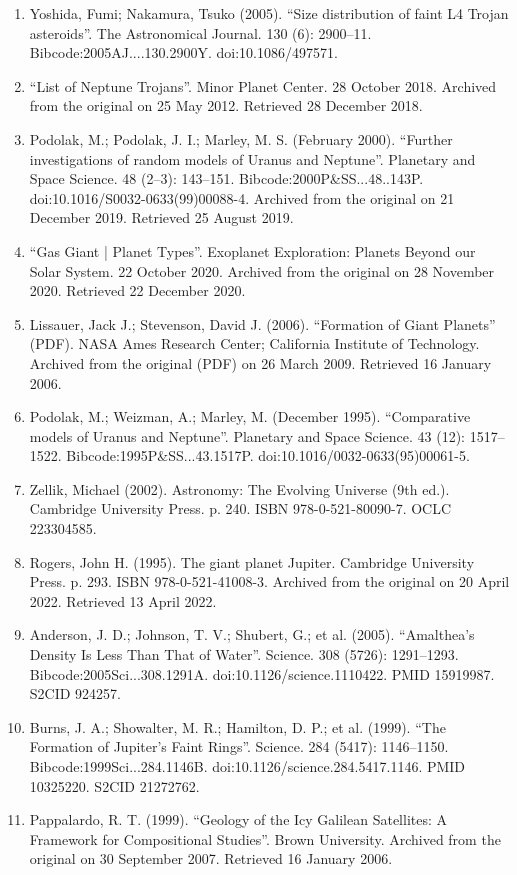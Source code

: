 \begin{enumerate}
\item Yoshida, Fumi; Nakamura, Tsuko (2005). ``Size distribution of faint L4 Trojan asteroids''. The Astronomical Journal. 130 (6): 2900–11. Bibcode:2005AJ....130.2900Y. doi:10.1086/497571.
\item ``List of Neptune Trojans''. Minor Planet Center. 28 October 2018. Archived from the original on 25 May 2012. Retrieved 28 December 2018.
\item Podolak, M.; Podolak, J. I.; Marley, M. S. (February 2000). ``Further investigations of random models of Uranus and Neptune''. Planetary and Space Science. 48 (2–3): 143–151. Bibcode:2000P\&SS...48..143P. doi:10.1016/S0032-0633(99)00088-4. Archived from the original on 21 December 2019. Retrieved 25 August 2019.
\item ``Gas Giant | Planet Types''. Exoplanet Exploration: Planets Beyond our Solar System. 22 October 2020. Archived from the original on 28 November 2020. Retrieved 22 December 2020.
\item Lissauer, Jack J.; Stevenson, David J. (2006). ``Formation of Giant Planets'' (PDF). NASA Ames Research Center; California Institute of Technology. Archived from the original (PDF) on 26 March 2009. Retrieved 16 January 2006.
\item Podolak, M.; Weizman, A.; Marley, M. (December 1995). ``Comparative models of Uranus and Neptune''. Planetary and Space Science. 43 (12): 1517–1522. Bibcode:1995P\&SS...43.1517P. doi:10.1016/0032-0633(95)00061-5.
\item Zellik, Michael (2002). Astronomy: The Evolving Universe (9th ed.). Cambridge University Press. p. 240. ISBN 978-0-521-80090-7. OCLC 223304585.
\item Rogers, John H. (1995). The giant planet Jupiter. Cambridge University Press. p. 293. ISBN 978-0-521-41008-3. Archived from the original on 20 April 2022. Retrieved 13 April 2022.
\item Anderson, J. D.; Johnson, T. V.; Shubert, G.; et al. (2005). ``Amalthea's Density Is Less Than That of Water''. Science. 308 (5726): 1291–1293. Bibcode:2005Sci...308.1291A. doi:10.1126/science.1110422. PMID 15919987. S2CID 924257.
\item Burns, J. A.; Showalter, M. R.; Hamilton, D. P.; et al. (1999). ``The Formation of Jupiter's Faint Rings''. Science. 284 (5417): 1146–1150. Bibcode:1999Sci...284.1146B. doi:10.1126/science.284.5417.1146. PMID 10325220. S2CID 21272762.
\item Pappalardo, R. T. (1999). ``Geology of the Icy Galilean Satellites: A Framework for Compositional Studies''. Brown University. Archived from the original on 30 September 2007. Retrieved 16 January 2006.

\end{enumerate}
